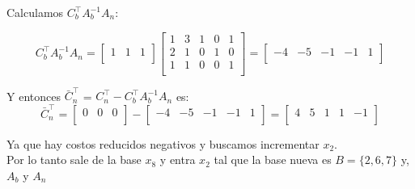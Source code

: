 \documentclass{article}
\begin{document}
\begin{flushleft}
		Calculamos $C_b^\intercal$$A_b^{-1}$$A_n$:
		
		\begin{equation*}
			C_b^\intercal A_b^{-1}A_n = \begin{bmatrix}
				1 & 1 & 1 \\
			\end{bmatrix}
			\begin{bmatrix}
				1 & 3 & 1 & 0 & 1  \\
				2 & 1 & 0 & 1 & 0 \\
				1 & 1 & 0 & 0 & 1 \\	
			\end{bmatrix} = \begin{bmatrix}
				-4 & -5 & -1 & -1 & 1 \\
			\end{bmatrix}
		\end{equation*}

		Y entonces \(\bar{C}_n^\intercal\) = \(C_n^\intercal - C_b^\intercal A_b^{-1} A_n\) es:
		\begin{equation*}
			\bar{C}_n^\intercal = \begin{bmatrix}
				0 & 0 & 0\\
			\end{bmatrix} - \begin{bmatrix}
				-4 & -5 & -1 & -1 & 1 \\
			\end{bmatrix} = \begin{bmatrix}
				4 & 5 & 1 & 1 & -1 \\
			\end{bmatrix}
		\end{equation*}
		\vspace{0,5cm}
		
		Ya que hay costos reducidos negativos y buscamos incrementar $x_2$. \\


		Por lo tanto sale de la base $x_8$ y entra $x_2$ tal que la base nueva es $B = \{2,6,7\}$ y, $A_b$ y $A_n$\\



\end{flushleft}
\end{document}
